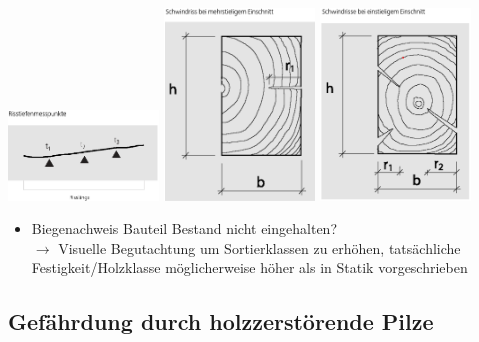 \documentclass[fleqn,twoside]{article}
\begin{document}
                \includegraphics[width=0.3\textwidth]{Grafiken/Beurteilen alter Holzkonstruktionen/Visuelle Holzsortierung nach DIN4074-1/Risstiefenmesspunkte.png}
                \includegraphics[width=0.3\textwidth]{Grafiken/Beurteilen alter Holzkonstruktionen/Visuelle Holzsortierung nach DIN4074-1/Schwindrisse bei mehrstieligem Einschnitt.png}
                \includegraphics[width=0.3\textwidth]{Grafiken/Beurteilen alter Holzkonstruktionen/Visuelle Holzsortierung nach DIN4074-1/Schwindrisse bei einstieligem Einschnitt.png}
        \begin{itemize}
            \item Biegenachweis Bauteil Bestand nicht eingehalten?\\
                $\rightarrow$ Visuelle Begutachtung um Sortierklassen zu erhöhen, tatsächliche Festigkeit/Holzklasse möglicherweise höher als in Statik vorgeschrieben
        \end{itemize}   

    
    
    \subsection{Gefährdung durch holzzerstörende Pilze}
\end{document}
